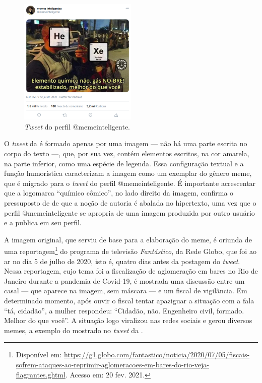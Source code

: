 \documentclass{textolivre}
\begin{document}
\begin{figure}[htbp]
 \centering
 \includegraphics[width=0.5\textwidth]{Fig2.png}
 \caption{\textit{Tweet} do perfil @memeinteligente.}
 \label{fig02}
 \end{figure}

O \textit{tweet} da  é formado apenas por uma imagem — não há uma parte escrita no corpo do texto —, que, por sua vez, contém elementos escritos, na cor amarela, na parte inferior, como uma espécie de legenda. Essa configuração textual e a função humorística caracterizam a imagem como um exemplar do gênero meme, que é migrado para o \textit{tweet} do perfil @memeinteligente. É importante acrescentar que a logomarca “químico cômico”, no lado direito da imagem, confirma o pressuposto de \textcite{xavier_desafio_2015} de que a noção de autoria é abalada no hipertexto, uma vez que o perfil @memeinteligente se apropria de uma imagem produzida por outro usuário e a publica em seu perfil.

A imagem original, que serviu de base para a elaboração do meme, é oriunda de uma reportagem\footnote{Disponível em: \url{https://g1.globo.com/fantastico/noticia/2020/07/05/fiscais-sofrem-ataques-ao-reprimir-aglomeracoes-em-bares-do-rio-veja-flagrantes.ghtml}. Acesso em: 20 fev. 2021.} do programa de televisão \textit{Fantástico}, da Rede Globo, que foi ao ar no dia 5 de julho de 2020, isto é, quatro dias antes da postagem do \textit{tweet}. Nessa reportagem, cujo tema foi a fiscalização de aglomeração em bares no Rio de Janeiro durante a pandemia de Covid-19, é mostrada uma discussão entre um casal — que aparece na imagem, sem máscara — e um fiscal de vigilância. Em determinado momento, após ouvir o fiscal tentar apaziguar a situação com a fala “tá, cidadão”, a mulher respondeu: “Cidadão, não. Engenheiro civil, formado. Melhor do que você”. A situação logo viralizou nas redes sociais e gerou diversos memes, a exemplo do mostrado no \textit{tweet} da .
\end{document}
